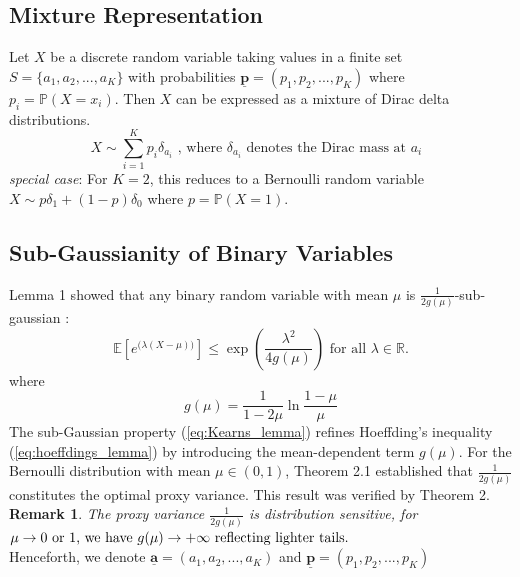 \documentclass[a4paper, 10pt]{article}
\theoremstyle{definition}
\begin{document}
\subsection{Mixture Representation}
Let \(X\) be a discrete random variable taking values in a finite set $S = \{a_1, a_2, ..., a_K\}$ with probabilities $\underline{\textbf{p}} = (p_1, p_2, ..., p_K)$ where $p_i = \mathbb{P}(X=x_i)$. Then \(X\) can be expressed as a mixture of Dirac delta distributions.
\begin{equation}
    X \sim \sum_{i=1}^{K} p_i \delta_{a_i}  \text{ ,  where   } \delta_{a_i} \text{  denotes the Dirac mass at $a_{i}$ }
\end{equation}
\textit{special case}: For $K=2$, this reduces to a Bernoulli random variable $X \sim p\delta_1 + (1-p)\delta_0$ where $p=\mathbb{P}(X=1)$. 


\subsection{Sub-Gaussianity of Binary Variables}
\cite{Kearns1998LargeDM} Lemma 1 showed that any binary random variable with mean $\mu$  is $\frac{1}{2g(\mu)}$-sub-gaussian :
\begin{equation}
    \mathbb{E}\left[e^{({\lambda (X - \mu))}}\right] \leq \exp\left(\frac{\lambda^2}{4g(\mu)}\right) \text{ for all } \lambda \in \mathbb{R}.
    \label{eq:Kearns_lemma}
\end{equation}
where 
\begin{equation}
    g(\mu) = \frac{1}{1-2\mu}{\ln\frac{1-\mu}{\mu}}
\end{equation}
The sub-Gaussian property (\ref{eq:Kearns_lemma}) refines Hoeffding's inequality (\ref{eq:hoeffdings_lemma}) by introducing the mean-dependent term $g(\mu)$. For the Bernoulli distribution with mean $\mu \in (0,1)$,  \cite{buldygin2013sub} Theorem 2.1 established that $\frac{1}{2g(\mu)} $ constitutes the optimal proxy variance. This result was verified by \cite{marchal2017sub} Theorem 2.\\
\textbf{Remark 1}. \textit{The proxy variance $\frac{1}{2g(\mu)}$ is distribution sensitive, for $\mu \rightarrow 0 \text{ or 1, we have }\\ g(\mu) \rightarrow +\infty \text{ reflecting lighter tails.}$}\\
Henceforth, we denote $\underline{\textbf{a}} = (a_1, a_2, ..., a_K)$ and $\underline{\textbf{p}} = (p_1, p_2, ..., p_K)$
\end{document}

